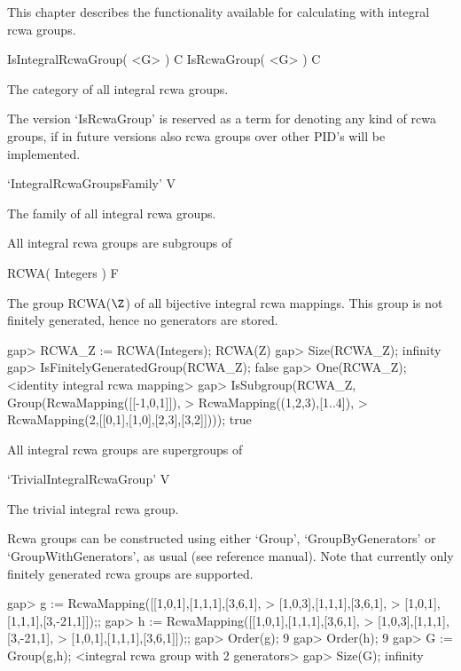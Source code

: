 

This chapter describes the functionality available for calculating with
integral rcwa groups.


\>IsIntegralRcwaGroup( <G> ) C
\>IsRcwaGroup( <G> ) C

The category of all integral rcwa groups.

The version `IsRcwaGroup' is reserved as a term for denoting any kind
of rcwa groups, if in future versions also rcwa groups over other
PID's will be implemented.

\>`IntegralRcwaGroupsFamily' V

The family of all integral rcwa groups.

All integral rcwa groups are subgroups of

\>RCWA( Integers ) F

The group RCWA($\Z$) of all bijective integral rcwa mappings.
This group is not finitely generated, hence no generators are stored.

\beginexample
gap> RCWA_Z := RCWA(Integers);
RCWA(Z)
gap> Size(RCWA_Z);
infinity
gap> IsFinitelyGeneratedGroup(RCWA_Z);
false
gap> One(RCWA_Z);
<identity integral rcwa mapping>
gap> IsSubgroup(RCWA_Z, Group(RcwaMapping([[-1,0,1]]),
>                             RcwaMapping((1,2,3),[1..4]),
>                             RcwaMapping(2,[[0,1],[1,0],[2,3],[3,2]])));
true 
\endexample

All integral rcwa groups are supergroups of

\>`TrivialIntegralRcwaGroup' V

The trivial integral rcwa group.


Rcwa groups can be constructed using either `Group', `GroupByGenerators'
or `GroupWithGenerators', as usual (see reference manual).
Note that currently only finitely generated rcwa groups are supported.

\beginexample
gap> g := RcwaMapping([[1,0,1],[1,1,1],[3,6,1],
>                      [1,0,3],[1,1,1],[3,6,1],
>                      [1,0,1],[1,1,1],[3,-21,1]]);;
gap> h := RcwaMapping([[1,0,1],[1,1,1],[3,6,1],
>                      [1,0,3],[1,1,1],[3,-21,1],
>                      [1,0,1],[1,1,1],[3,6,1]]);;
gap> Order(g);
9
gap> Order(h);
9
gap> G := Group(g,h);
<integral rcwa group with 2 generators>
gap> Size(G);
infinity
\endexample

